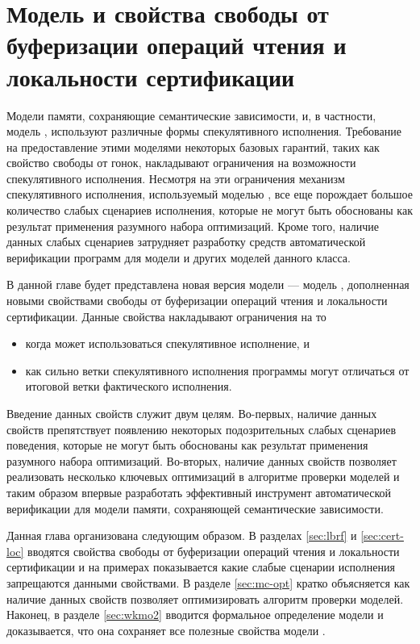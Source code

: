 \chapter{Модель \WkmS и свойства свободы от буферизации операций чтения и локальности сертификации}
\label{ch:weakestmo2}

Модели памяти, сохраняющие семантические зависимости,
и, в частности, модель \Wkm, используют различные формы
спекулятивного исполнения.
Требование на предоставление этими моделями некоторых базовых гарантий,
таких как свойство свободы от гонок, накладывают
ограничения на возможности спекулятивного исполнения.
Несмотря на эти ограничения механизм спекулятивного исполнения,
используемый моделью \Wkm, все еще порождает большое количество
слабых сценариев исполнения,
которые не могут быть обоснованы как результат применения
разумного набора оптимизаций.
Кроме того, наличие данных слабых сценариев
затрудняет разработку средств автоматической верификации
программ для модели \Wkm и других моделей данного класса. 

В данной главе будет представлена новая версия модели \Wkm ---
модель \WkmS, дополненная новыми свойствами
свободы от буферизации операций чтения и локальности сертификации.
Данные свойства накладывают ограничения на то
\begin{itemize}
  \item когда может использоваться спекулятивное исполнение, и
  \item как сильно ветки спекулятивного исполнения программы 
    могут отличаться от итоговой ветки фактического исполнения. 
\end{itemize}
Введение данных свойств служит двум целям. 
Во-первых, наличие данных свойств препятствует появлению 
некоторых подозрительных слабых сценариев поведения, 
которые не могут быть обоснованы как результат применения
разумного набора оптимизаций. 
Во-вторых, наличие данных свойств позволяет реализовать 
несколько ключевых оптимизаций в алгоритме проверки моделей 
и таким образом впервые разработать эффективный инструмент
автоматической верификации для модели памяти,
сохраняющей семантические зависимости. 

Данная глава организована следующим образом. 
В разделах \ref{sec:lbrf} и \ref{sec:cert-loc}
вводятся свойства свободы от буферизации операций чтения 
и локальности сертификации и на примерах показывается 
какие слабые сценарии исполнения запрещаются данными свойствами. 
В разделе \ref{sec:mc-opt} кратко объясняется как 
наличие данных свойств позволяет оптимизировать 
алгоритм проверки моделей. 
Наконец, в разделе \ref{sec:wkmo2} вводится 
формальное определение модели \WkmS 
и доказывается, что она сохраняет все полезные свойства модели \Wkm.

